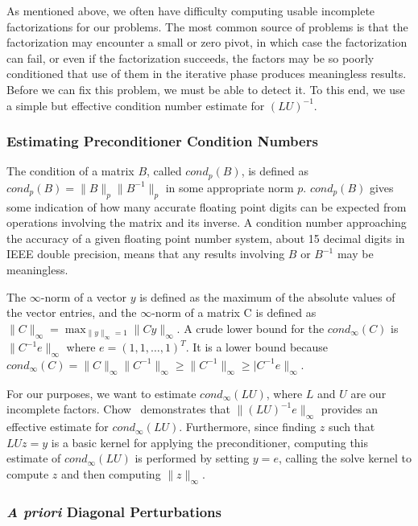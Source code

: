 \documentclass[12pt,relax]{AztecOOUserGuide}
\begin{document}
As mentioned above, we often have difficulty computing usable incomplete
factorizations for our problems.  The most common source of problems
is that the factorization may encounter a small or zero pivot,
in which case the factorization can fail, or even if the factorization
succeeds, the factors may be so poorly conditioned that use of them in
the iterative phase produces meaningless results.  Before we can fix
this problem, we must be able to detect it.  To this end, we use a
simple but effective condition number estimate for $(LU)^{-1}$.

\subsubsection{Estimating Preconditioner Condition Numbers}

The condition of a matrix $B$, called $cond_p(B)$, is defined as
$cond_p(B)
= \|B\|_p\|B^{-1}\|_p$ in some appropriate norm $p$.  $cond_p(B)$
gives some indication of how many accurate floating point
digits can be expected from operations involving the matrix and its
inverse.  A condition number approaching the accuracy of a given
floating point number system, about 15 decimal digits in IEEE double
precision, means that any results involving $B$ or $B^{-1}$ may be 
meaningless.

The $\infty$-norm of a vector $y$ is defined as the maximum of the 
absolute values of the vector entries, and the $\infty$-norm of a 
matrix C is defined as 
$\|C\|_\infty = \max_{\|y\|_\infty = 1} \|Cy\|_\infty$.  
A crude lower bound for the $cond_\infty(C)$ is
$\|C^{-1}e\|_\infty$ where $e = (1, 1, \ldots, 1)^T$.  It is a
lower bound because $cond_\infty(C) = \|C\|_\infty\|C^{-1}\|_\infty
\ge \|C^{-1}\|_\infty \ge |C^{-1}e\|_\infty$.

For our purposes, we want to estimate $cond_\infty(LU)$, where $L$ and
$U$ are our incomplete factors.  Chow~\cite{Chow:97} demonstrates that
$\|(LU)^{-1}e\|_\infty$ provides an effective estimate for
$cond_\infty(LU)$.  Furthermore, since finding $z$ such that $LUz = y$
is a basic kernel for applying the preconditioner, computing this
estimate of $cond_\infty(LU)$ is performed by setting $y = e$, calling
the solve kernel to compute $z$ and then
computing $\|z\|_\infty$.


\subsubsection{{\it A priori} Diagonal Perturbations}
\end{document}
